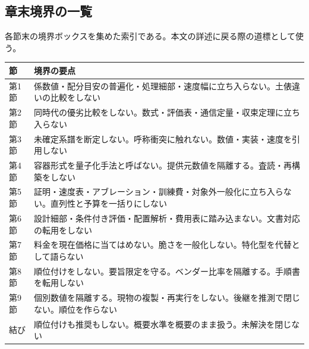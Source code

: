 \documentclass[lualatex,a4paper,10pt]{jlreq}
\begin{document}
\subsection*{章末境界の一覧}
各節末の境界ボックスを集めた索引である。本文の詳述に戻る際の道標として使う。
\begin{tabularx}{\textwidth}{@{}>{\raggedright\arraybackslash}p{}>{\raggedright\arraybackslash}X@{}}
\toprule
節 & 境界の要点 \\
\midrule
第1節 & 係数値・配分目安の普遍化・処理細部・速度幅に立ち入らない。土俵違いの比較をしない \\
第2節 & 同時代の優劣比較をしない。数式・評価表・通信定量・収束定理に立ち入らない \\
第3節 & 未確定系譜を断定しない。呼称衝突に触れない。数値・実装・速度を引用しない \\
第4節 & 容器形式を量子化手法と呼ばない。提供元数値を隔離する。査読・再構築をしない \\
第5節 & 証明・速度表・アブレーション・訓練費・対象外一般化に立ち入らない。直列性と予算を一括りにしない \\
第6節 & 設計細部・条件付き評価・配置解析・費用表に踏み込まない。文書対応の転用をしない \\
第7節 & 料金を現在価格に当てはめない。脆さを一般化しない。特化型を代替として語らない \\
第8節 & 順位付けをしない。要旨限定を守る。ベンダー比率を隔離する。手順書を転用しない \\
第9節 & 個別数値を隔離する。現物の複製・再実行をしない。後継を推測で閉じない。順位を作らない \\
結び & 順位付けも推奨もしない。概要水準を概要のまま扱う。未解決を閉じない \\
\bottomrule
\end{tabularx}
\normalsize

\end{document}
